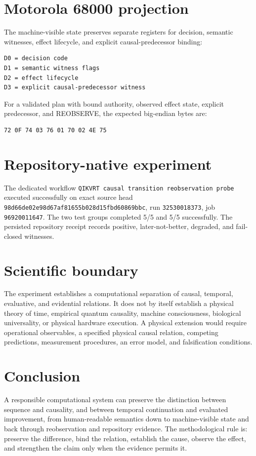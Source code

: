 \documentclass[11pt]{article}
\begin{document}
\section{Motorola 68000 projection}
The machine-visible state preserves separate registers for decision, semantic witnesses, effect lifecycle, and explicit causal-predecessor binding:
\begin{verbatim}
D0 = decision code
D1 = semantic witness flags
D2 = effect lifecycle
D3 = explicit causal-predecessor witness
\end{verbatim}
For a validated plan with bound authority, observed effect state, explicit predecessor, and REOBSERVE, the expected big-endian bytes are:
\begin{verbatim}
72 0F 74 03 76 01 70 02 4E 75
\end{verbatim}

\section{Repository-native experiment}
The dedicated workflow \texttt{QIKVRT causal transition reobservation probe} executed successfully on exact source head \texttt{98d66de02e98d67af81655b028d15fbd60869bbc}, run \texttt{32530018373}, job \texttt{96920011647}. The two test groups completed 5/5 and 5/5 successfully. The persisted repository receipt records positive, later-not-better, degraded, and fail-closed witnesses.

\section{Scientific boundary}
The experiment establishes a computational separation of causal, temporal, evaluative, and evidential relations. It does not by itself establish a physical theory of time, empirical quantum causality, machine consciousness, biological universality, or physical hardware execution. A physical extension would require operational observables, a specified physical causal relation, competing predictions, measurement procedures, an error model, and falsification conditions.

\section{Conclusion}
A responsible computational system can preserve the distinction between sequence and causality, and between temporal continuation and evaluated improvement, from human-readable semantics down to machine-visible state and back through reobservation and repository evidence. The methodological rule is: preserve the difference, bind the relation, establish the cause, observe the effect, and strengthen the claim only when the evidence permits it.
\end{document}
